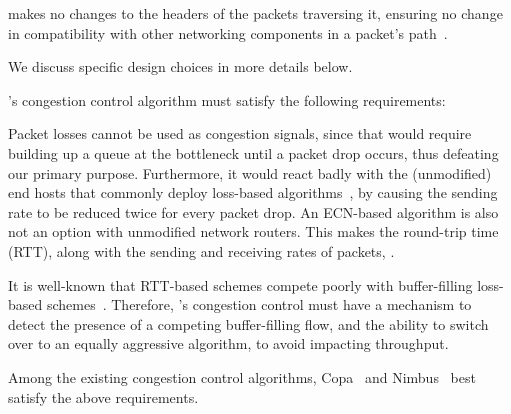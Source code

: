  \name makes no changes to the headers of the packets traversing it, ensuring no change in compatibility with other networking components in a packet's path~\cite{mboxbadness, ipoptions, quic}.

\vspace{5pt}
\noindent We discuss specific design choices in more details below. 

\name's congestion control algorithm must satisfy the following requirements: 

 Packet losses cannot  be used as congestion signals, since that would require building up a queue at the bottleneck until a packet drop occurs, thus defeating our primary purpose. Furthermore, it would react badly with the (unmodified) end hosts that commonly deploy loss-based algorithms~\cite{cubic}, by causing the sending rate to be reduced twice for every packet drop. An ECN-based algorithm is also not an option with unmodified network routers. This makes the round-trip time (RTT), along with the sending and receiving rates of packets, .

 It is well-known that RTT-based schemes compete poorly with buffer-filling loss-based schemes~\cite{nimbus, copa, timely}. Therefore, \name's congestion control must have a mechanism to detect the presence of a competing buffer-filling flow, and the ability to switch over to an equally aggressive algorithm, to avoid impacting throughput. 

Among the existing congestion control algorithms, Copa~\cite{copa} and Nimbus~\cite{nimbus} best satisfy the above requirements.  




